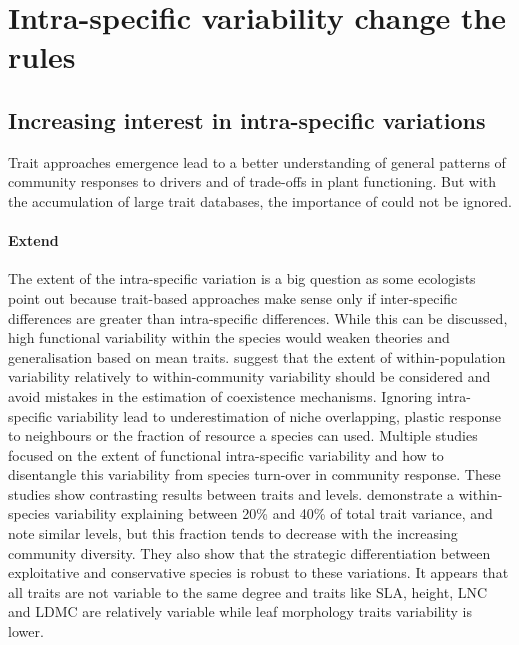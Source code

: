 \section{Intra-specific variability change the rules}


\subsection{Increasing interest in intra-specific variations}

Trait approaches emergence lead to a better understanding of general patterns of community responses to drivers and of trade-offs in plant functioning. But with the accumulation of large trait databases, the importance of  could not be ignored.

\paragraph{Extend}

The extent of the intra-specific variation is a big question as some ecologists point out because trait-based approaches make sense only if inter-specific differences are greater than intra-specific differences. While this can be discussed, high functional variability within the species would weaken theories and generalisation based on mean traits. \cite{violle_return_2012} suggest that the extent of within-population variability relatively to within-community variability should be considered and avoid mistakes in the estimation of coexistence mechanisms. Ignoring intra-specific variability lead to underestimation of niche overlapping, plastic response to neighbours or the fraction of resource a species can used. Multiple studies focused on the extent of functional intra-specific variability \parencite{albert_intraspecific_2010, albert_multi-trait_2010} and how to disentangle this variability from species turn-over \parencite{leps_community_2011} in community response. These studies show contrasting results between traits and levels. \cite{albert_multi-trait_2010} demonstrate a within-species variability explaining between 20\% and 40\% of total trait variance, and \cite{siefert_global_2015} note similar levels, but this fraction tends to decrease with the increasing community diversity. They also show that the strategic differentiation between exploitative and conservative species is robust to these variations. It appears that all traits are not variable to the same degree and traits like SLA, height, LNC and LDMC are relatively variable while leaf morphology traits variability is lower\cite{siefert_global_2015}. 

